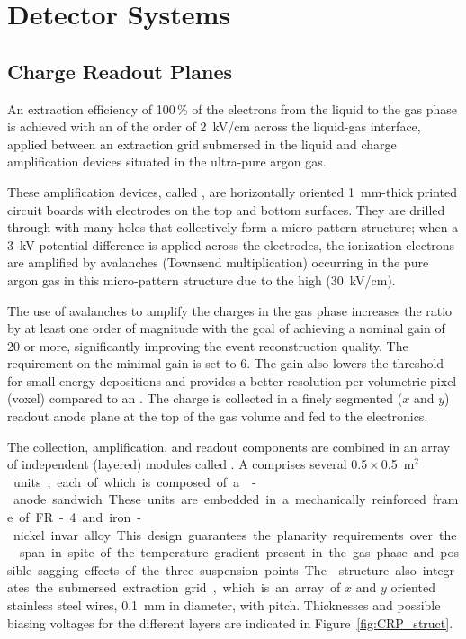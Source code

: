 \section{Detector Systems}
\label{sec:dp-execsum-systems}

\subsection{Charge Readout Planes}
\label{sec:dp-execsum-crp}

An extraction efficiency of \num{100}\,\% of the electrons from the liquid to the gas phase is achieved with an \efield of the order of \SI{2}{kV/cm} across the liquid-gas interface, applied between an  extraction grid submersed in the liquid and charge amplification  devices situated in the ultra-pure argon gas. 

These amplification devices, called , are horizontally  oriented \SI{1}{mm}-thick printed  circuit boards with electrodes on the top and bottom surfaces. They are drilled through with many holes that collectively form a micro-pattern structure;  when a \SI{3}{kV} potential difference is applied across the electrodes, the ionization electrons are amplified by avalanches (Townsend multiplication) occurring in the  pure argon gas in this micro-pattern structure due to the high \efield (\SI{30}{kV/cm}).

The use of avalanches to amplify the charges in the gas phase increases the  ratio by at least one order of magnitude with the goal of achieving a nominal gain of 20 or more, significantly improving the event reconstruction quality. The requirement on the minimal  gain is set to 6.  The gain also lowers the threshold for small energy depositions and provides a better resolution per volumetric pixel (voxel) compared to an  .  The charge is collected in a finely segmented \twod ($x$ and $y$) readout anode plane at the top of the gas volume and fed to the  electronics.   

The  collection, amplification, and readout components are combined in an array of independent (layered) modules called . A  comprises several \num{0.5}\,$\times$\,\SI{0.5}{m$^2$} units, each of which is composed  of a -anode sandwich.  These units are embedded in a mechanically reinforced frame of FR-4 and iron-nickel invar alloy. This design guarantees the planarity requirements over the  span in spite of the temperature gradient present in the gas phase and possible sagging effects of the three suspension points. The  structure also integrates  the submersed extraction grid, which is an array of $x$ and $y$ oriented stainless steel wires, \SI{0.1}{mm} in diameter, with \dpstrippitch pitch. Thicknesses and possible biasing voltages for the different layers are indicated in Figure~\ref{fig:CRP_struct}.

